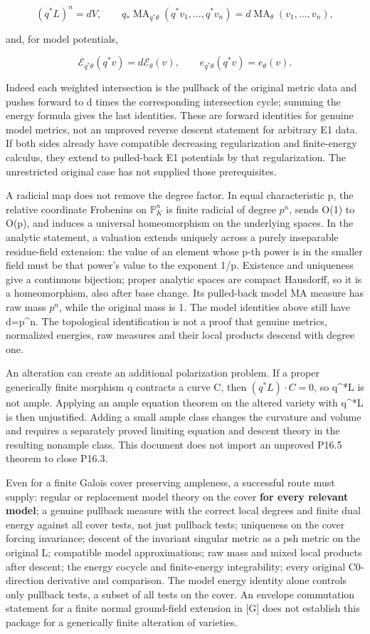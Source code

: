 \documentclass[11pt]{article}
\newcommand{\MA}{\operatorname{MA}}
\begin{document}
\[
(q^*L)^n=dV,\qquad
q_*\MA_{q^*\theta}(q^*v_1,\ldots,q^*v_n)=d\MA_\theta(v_1,\ldots,v_n),
\]

and, for model potentials,

\[
\mathcal E_{q^*\theta}(q^*v)=d\mathcal E_\theta(v),
\qquad e_{q^*\theta}(q^*v)=e_\theta(v).
\]

Indeed each weighted intersection is the pullback of the original metric data and pushes forward to d times the corresponding intersection cycle; summing the energy formula gives the last identities. These are forward identities for genuine model metrics, not an unproved reverse descent statement for arbitrary E1 data. If both sides already have compatible decreasing regularization and finite-energy calculus, they extend to pulled-back E1 potentials by that regularization. The unrestricted original case has not supplied those prerequisites.

A radicial map does not remove the degree factor. In equal characteristic p, the relative coordinate Frobenius on \(\mathbb P^n_K\) is finite radicial of degree \(p^n\), sends O(1) to O(p), and induces a universal homeomorphism on the underlying spaces. In the analytic statement, a valuation extends uniquely across a purely inseparable residue-field extension: the value of an element whose p-th power is in the smaller field must be that power's value to the exponent 1/p. Existence and uniqueness give a continuous bijection; proper analytic spaces are compact Hausdorff, so it is a homeomorphism, also after base change. Its pulled-back model MA measure has raw mass \(p^n\), while the original mass is 1. The model identities above still have d=p\textasciicircum{}n. The topological identification is not a proof that genuine metrics, normalized energies, raw measures and their local products descend with degree one.

An alteration can create an additional polarization problem. If a proper generically finite morphism q contracts a curve C, then \((q^*L)\cdot C=0\), so q\textasciicircum{}*L is not ample. Applying an ample equation theorem on the altered variety with q\textasciicircum{}*L is then unjustified. Adding a small ample class changes the curvature and volume and requires a separately proved limiting equation and descent theory in the resulting nonample class. This document does not import an unproved P16.5 theorem to close P16.3.

Even for a finite Galois cover preserving ampleness, a successful route must supply: regular or replacement model theory on the cover \textbf{for every relevant model}; a genuine pullback measure with the correct local degrees and finite dual energy against all cover tests, not just pullback tests; uniqueness on the cover forcing invariance; descent of the invariant singular metric as a psh metric on the original L; compatible model approximations; raw mass and mixed local products after descent; the energy cocycle and finite-energy integrability; every original C0-direction derivative and comparison. The model energy identity alone controls only pullback tests, a subset of all tests on the cover. An envelope commutation statement for a finite normal ground-field extension in [G] does not establish this package for a generically finite alteration of varieties.
\end{document}
